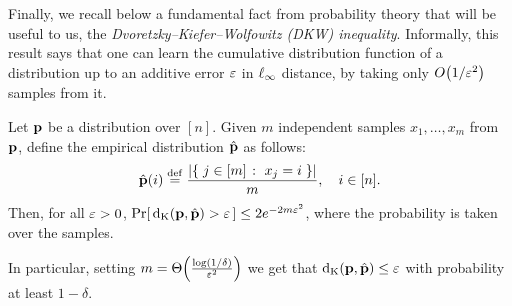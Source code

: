 Finally, we recall below a fundamental fact from probability theory that will be useful to us, the \emph{Dvoretzky--Kiefer--Wolfowitz (DKW) inequality}. Informally, this result says that one can learn the cumulative distribution function of a distribution up to an additive error $\eps$ in $\lp[\infty]$ distance, by taking only $\bigO{1/\eps^2}$ samples from it.
\begin{theorem}\label{theo:dkw:ineq}
Let $\D$ be a distribution over $[n]$. Given $m$ independent samples $x_1,\dots ,x_m$ from $\D$, define the empirical distribution $\hat{\D}$ as follows:
\[
\hat{\D}(i) \eqdef \frac{\abs{ \setOfSuchThat{j\in[m]}{x_j=i} } }{m}, \quad i\in[n].
\]
Then, for all $\eps > 0$, $\probaOf{ \kolmogorov{\D}{\hat{\D}} > \eps } \leq 2e^{-2m\eps^2}$, where the probability is taken over the samples.
\end{theorem} 
\noindent In particular, setting $m=\bigTheta{\frac{\log(1/\delta)}{\eps^2}}$ we get that $\kolmogorov{\D}{\hat{\D}} \leq \eps$ with probability at least $1-\delta$.


